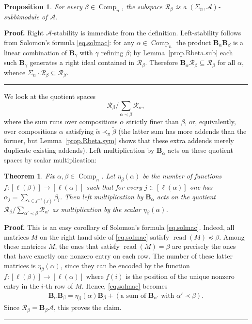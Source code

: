 \documentclass[submission]{FPSAC2026}
\newtheorem{theorem}{Theorem}
\newtheorem{proposition}{Proposition}
\newcommand{\BB}{\mathbf{B}} %
\newcommand{\Comp}{\operatorname{Comp}}
\newcommand{\tup}[1]{\left( #1 \right)}
\newcommand{\ive}[1]{\left[ #1 \right]}
\newenvironment{proof}[1][Proof]{\noindent\textbf{#1.} }{\ \rule{0.5em}{0.5em}}
\begin{document}
\begin{proposition}\label{prop.Rbeta.subbi}
For every \(\beta\in\Comp_n\), the subspace \(\mathcal R_\beta\) is a
\((\Sigma_n,\mathcal A)\)-subbimodule of \(\mathcal A\).
\end{proposition}

\begin{proof}
Right \(\mathcal A\)-stability is immediate from the definition.
Left-stability follows from Solomon's formula \eqref{eq.solmac}: for any
\(\alpha\in\Comp_n\) the product \(\mathbf{B}_\alpha\mathbf{B}_\beta\) is a
linear combination of \(\mathbf{B}_\gamma\) with \(\gamma\) refining
\(\beta\); by Lemma~\ref{prop.Rbeta.sub} each such \(\mathbf{B}_\gamma\)
generates a right ideal contained in \(\mathcal R_\beta\).  Therefore
\(\mathbf{B}_\alpha\mathcal R_\beta\subseteq\mathcal R_\beta\) for all
\(\alpha\), whence \(\Sigma_n\cdot\mathcal R_\beta\subseteq\mathcal R_\beta\).
\end{proof}
We look at the quotient spaces
\[
\mathcal R_\beta/\sum_{\alpha\prec\beta}\mathcal R_\alpha,
\]
where the sum runs over compositions \(\alpha\) strictly finer than
\(\beta\), or, equivalently, over compositions \(\alpha\) satisfying
\(\widetilde{\alpha} \prec_\pi \widetilde{\beta}\)
(the latter sum has more addends than the former, but
Lemma~\ref{prop.Rbeta.sym} shows that these extra addends
merely duplicate existing addends).
Left multiplication by \(\mathbf{B}_\alpha\) acts on these
quotient spaces by scalar multiplication:


\begin{theorem}\label{thm.Rbeta.act-on-quot}
Fix \(\alpha,\beta\in\Comp_n\). Let \(\eta_\beta(\alpha)\) be the number
of functions \(f:[\ell(\beta)]\to[\ell(\alpha)]\) such that for every
\(j\in[\ell(\alpha)]\) one has \(\alpha_j=\sum_{i\in f^{-1}(j)}\beta_i\).
Then left multiplication by \(\mathbf{B}_\alpha\) acts on the quotient
\(\mathcal R_\beta/\sum_{\alpha'\prec\beta}\mathcal R_{\alpha'}\) as
multiplication by the scalar \(\eta_\beta(\alpha)\).
\end{theorem}


\begin{proof}
This is an easy corollary of Solomon's formula \eqref{eq.solmac}.
Indeed, all matrices $M$ on the right hand side of
\eqref{eq.solmac} satisfy $\operatorname{read}(M) \preceq \beta$.
Among these matrices $M$, the ones that satisfy
$\operatorname{read}(M) = \beta$ are precisely the ones that have exactly one
nonzero entry on each row.
The number of these latter matrices is
\(\eta_\beta(\alpha)\), since they can be encoded by the
function $f : \ive{\ell(\beta)} \to \ive{\ell(\alpha)}$ where
$f\tup{i}$ is the position of the unique nonzero entry in the
$i$-th row of $M$.
Hence, \eqref{eq.solmac} becomes
\begin{align}
\BB_\alpha \BB_\beta = \eta_\beta(\alpha) \BB_\beta +
\tup{\text{a sum of } \BB_{\alpha'} \text{ with } \alpha' \prec \beta}.
\label{eq.BaBb=sum-prec}
\end{align}
Since $\mathcal{R}_\beta = \BB_\beta \mathcal{A}$, this proves the claim.
\end{proof}
\end{document}
